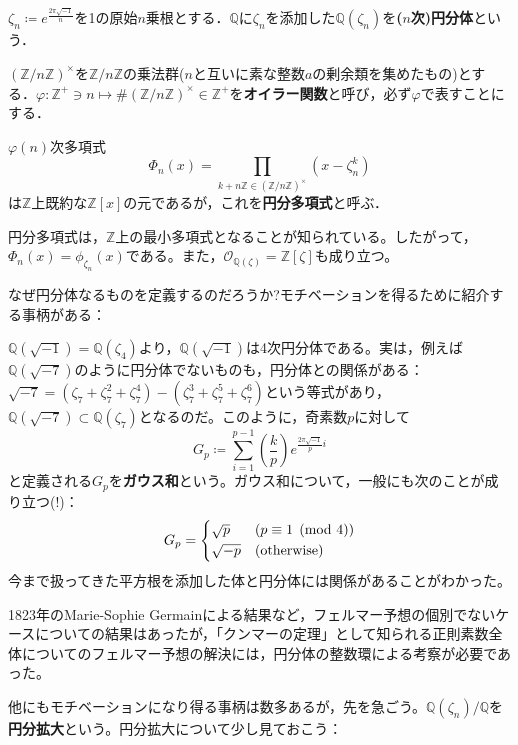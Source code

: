 \vspace{15pt}

\begin{dfn}[円分体]
    $\zeta_n\coloneqq e^{\frac{2\pi\sqrt{-1}}{n}}$を1の原始$n$乗根とする．$\mathbb{Q}$に$\zeta_n$を添加した$\mathbb{Q}(\zeta_n)$を\textbf{($n$次)円分体}という．
\end{dfn}
\begin{dfn}[オイラー関数]
    $(\mathbb{Z}/{n\mathbb{Z}})^{\times}$を$\mathbb{Z}/{n\mathbb{Z}}$の乗法群($n$と互いに素な整数$a$の剰余類を集めたもの)とする．$\varphi:\mathbb{Z}^+\ni n\mapsto\# (\mathbb{Z}/{n\mathbb{Z}})^{\times}\in\mathbb{Z}^+$を\textbf{オイラー関数}と呼び，必ず$\varphi$で表すことにする．
\end{dfn}
\begin{dfn}[円分多項式]
    $\varphi(n)$次多項式\[
    \Phi_n(x)=\prod_{k+n\mathbb{Z}\in(\mathbb{Z}/{n\mathbb{Z}})^{\times}}(x-\zeta_n^k)
    \]は$\mathbb{Z}$上既約な$\mathbb{Z}[x]$の元であるが，これを\textbf{円分多項式}と呼ぶ．
\end{dfn}
円分多項式は，$\mathbb{Z}$上の最小多項式となることが知られている。したがって，$\Phi_n(x)=\phi_{\zeta_n}(x)$である。また，$\mathcal{O}_{\mathbb{Q}(\zeta)}=\mathbb{Z}[\zeta]$も成り立つ。

なぜ円分体なるものを定義するのだろうか?モチベーションを得るために紹介する事柄がある：
\begin{mybox}[ガウス和]
    $\mathbb{Q}(\sqrt{-1})=\mathbb{Q}(\zeta_4)$より，$\mathbb{Q}(\sqrt{-1})$は4次円分体である。実は，例えば$\mathbb{Q}(\sqrt{-7})$のように円分体でないものも，円分体との関係がある：$\sqrt{-7}=(\zeta_7+\zeta_7^2+\zeta_7^4)-(\zeta_7^3+\zeta_7^5+\zeta_7^6)$という等式があり，$\mathbb{Q}(\sqrt{-7})\subset\mathbb{Q}(\zeta_7)$となるのだ。このように，奇素数$p$に対して\[
    G_p\coloneqq\sum_{i=1}^{p-1}\left(\frac{k}{p}\right)e^{\frac{2\pi\sqrt{-1}}{p}i}
    \]と定義される$G_p$を\textbf{ガウス和}という。ガウス和について，一般にも次のことが成り立つ(!)：\[
    G_p=\begin{cases*}
        \sqrt{p}&($p\equiv 1\pmod{4}$)\\
        \sqrt{-p}&(otherwise)
    \end{cases*}
    \]今まで扱ってきた平方根を添加した体と円分体には関係があることがわかった。
\end{mybox}
\begin{mybox}
    1823年のMarie-Sophie Germainによる結果など，フェルマー予想の個別でないケースについての結果はあったが，「クンマーの定理」として知られる正則素数全体についてのフェルマー予想の解決には，円分体の整数環による考察が必要であった。
\end{mybox}
他にもモチベーションになり得る事柄は数多あるが，先を急ごう。$\mathbb{Q}(\zeta_n)/{\mathbb{Q}}$を\textbf{円分拡大}という。円分拡大について少し見ておこう：

